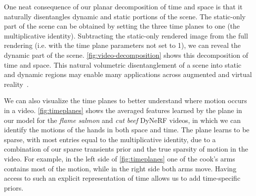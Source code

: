 \documentclass[10pt,twocolumn,letterpaper]{article}
\begin{document}
One neat consequence of our planar decomposition of time and space is that it naturally disentangles dynamic and static portions of the scene. The static-only part of the scene can be obtained by setting the three time planes to one (the multiplicative identity). Subtracting the static-only rendered image from the full rendering (i.e. with the time plane parameters not set to \num{1}), we can reveal the dynamic part of the scene.
\cref{fig:video-decomposition} shows this decomposition of time and space. This natural volumetric disentanglement of a scene into static and dynamic regions may enable many applications across augmented and virtual reality~\cite{volumentricdisentanglement}.

We can also visualize the time planes to better understand  where motion occurs in a video. \cref{fig:timeplanes} shows the averaged features learned by the  plane in our model for the \emph{flame salmon} and \emph{cut beef} DyNeRF videos, in which we can identify the motions of the hands in both space and time. 
The  plane learns to be sparse, with most entries equal to the multiplicative identity, due to a combination of our sparse transients prior and the true sparsity of motion in the video. For example, in the left side of \cref{fig:timeplanes} one of the cook's arms contains most of the motion, while in the right side both arms move. 
Having access to such an explicit representation of time allows us to add time-specific priors.
\end{document}
